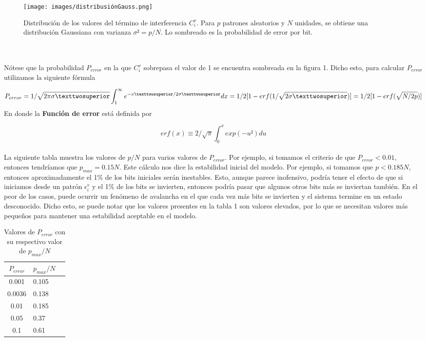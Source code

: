 \documentclass{article}
\begin{document}
\begin{figure}[h]
\centering
\texttt{[image: images/distribusiónGauss.png]}
\caption{Distribución de los valores del término de interferencia $C_i^v$. Para $p$ patrones aleatorios y $N$ unidades, se obtiene una distribución Gaussiana con varianza $\sigma² = p/N$. Lo sombreado es la probabilidad de error por bit.}
\label{fig:Espacio de soluciones}
\end{figure}
\\\\
Nótese que la probabilidad $P_{error}$ en la que $C_i^v$ sobrepasa el valor de 1 se encuentra sombreada en la figura 1. Dicho esto, para calcular  $P_{error}$ utilizamos la siguiente fórmula

\begin{equation}
    P_{error} = 1/\sqrt{2\pi\sigma²} \int_1^\infty e^{-x²/2\sigma²}dx = 1/2 [1-erf(1/\sqrt{2 \sigma²})] = 1/2 [1-erf(\sqrt{N/2p})]
    \label{eq:P_{error}}
\end{equation}
En donde la \textbf{Función de error} está definida por

\begin{equation}
    erf(x) \equiv 2/\sqrt{\pi} \int_0^x exp(-u²) du
    \label{eq:función de error}
\end{equation}
\\

La siguiente tabla muestra los valores de $p/N$ para varios valores de $P_{error}$. Por ejemplo, si tomamos el criterio de que $P_{error} < 0.01$, entonces tendríamos que $p_{max} = 0.15N$. Este cálculo nos dice la estabilidad inicial del modelo. Por ejemplo, si tomamos que $p < 0.185N$, entonces aproximadamente el 1\% de los bits iniciales serán inestables. Esto, aunque parece inofensivo, podría tener el efecto de que si iniciamos desde un patrón $\epsilon_i^v$ y el 1\% de los bits se invierten, entonces podría pasar que algunos otros bits más se inviertan también. En el peor de los casos, puede ocurrir un fenómeno de avalancha en el que cada vez más bits se invierten y el sistema termine en un estado desconocido.
Dicho esto, se puede notar que los valores presentes en la tabla 1 son valores elevados, por lo que se necesitan valores más pequeños para mantener una estabilidad aceptable en el modelo.
\begin{table}[]
    \centering
        \begin{tabular}{|c|l|r|}
        \hline
            $P_{error}$ & $p_{max}/N$ \\
        \hline
            0.001 & 0.105 \\
            0.0036 & 0.138 \\
            0.01 & 0.185 \\
            0.05 & 0.37 \\
            0.1 & 0.61 \\ 
        \hline
        \end{tabular}
    \caption{Valores de $P_{error}$ con su respectivo valor de $p_{max}/N$}
    \label{tab1}
\end{table}
\\\\
\end{document}
